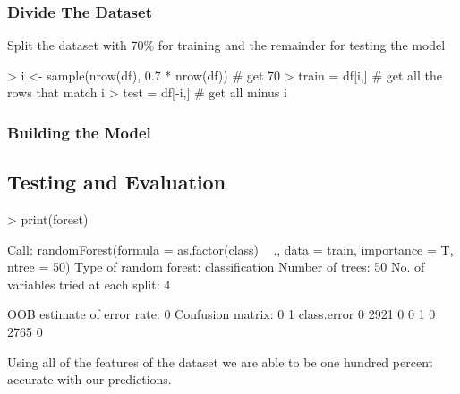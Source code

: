 \documentclass[12pt]{article}         %
\begin{document}
\subsubsection{Divide The Dataset}
Split the dataset with 70\% for training and the remainder for testing the model
\begin{Schunk}
\begin{Sinput}
> i <- sample(nrow(df), 0.7 * nrow(df)) # get 70% of the elements
> train = df[i,] # get all the rows that match i
> test =  df[-i,] # get all minus i
\end{Sinput}
\end{Schunk}
\subsubsection{Building the Model}
\begin{Schunk}
\end{Schunk}
\subsection{Testing and Evaluation}
\begin{Schunk}
\begin{Sinput}
> print(forest)
\end{Sinput}
\begin{Soutput}
Call:
 randomForest(formula = as.factor(class) ~ ., data = train, importance = T,      ntree = 50) 
               Type of random forest: classification
                     Number of trees: 50
No. of variables tried at each split: 4

        OOB estimate of  error rate: 0%
Confusion matrix:
     0    1 class.error
0 2921    0           0
1    0 2765           0
\end{Soutput}
\end{Schunk}
Using all of the features of the dataset we are able to be one hundred percent accurate with our predictions.
\end{document}
